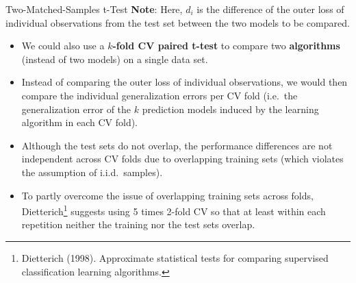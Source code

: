 \begin{frame}[c,allowframebreaks]{Two-Matched-Samples t-Test}
    \textbf{Note}: Here, $d_i$ is the difference of the outer loss of individual observations from the test set between the two models to be compared.

    \begin{itemize}
    \item We could also use a \textbf{$k$-fold CV paired t-test} to compare two \textbf{algorithms} (instead of two models) on a single data set.
    \item Instead of comparing the outer loss of individual observations, we
        would then compare the individual generalization errors per CV fold
        (i.e.\ the generalization error of the $k$ prediction models induced by the learning algorithm in each CV fold).
    \item Although the test sets do not overlap, the performance differences are
        not independent across CV folds due to overlapping training sets (which
        violates the assumption of i.i.d.\ samples).
    \item To partly overcome the issue of overlapping training sets across folds, Dietterich\footnote{Dietterich (1998). Approximate statistical tests for comparing supervised classification learning algorithms.} suggests using 5 times 2-fold CV so that at least within each repetition neither the training nor the test sets overlap.
    \end{itemize}
    \end{frame}

